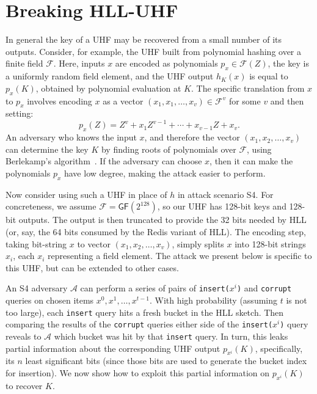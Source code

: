 \documentclass[sigconf, anonymous, dvipsnames]{acmart} %
\begin{document}
\section{Breaking HLL-UHF}\label{sec:UHF}

In general the key of a UHF may be recovered from a small number of its outputs. Consider, for example, the UHF built from polynomial hashing over a finite field $\mathcal{F}$. Here, inputs $x$ are encoded as polynomials $p_x \in \mathcal{F}(Z)$, the key is a uniformly random field element, and the UHF output $h_K(x)$  is equal to $p_x(K)$, obtained by polynomial evaluation at $K$. The specific translation from $x$ to $p_x$ involves encoding $x$ as a vector $(x_1,x_1,\ldots,x_v) \in \mathcal{F}^v$ for some $v$ and then setting:
\[
p_x(Z) = Z^v + x_1Z^{v-1} + \cdots + x_{v-1}Z + x_v.
\]
An adversary who knows the input $x$, and therefore the vector $(x_1,x_2,\ldots,x_v)$ can determine the key $K$ by finding roots of polynomials over $\mathcal{F}$, using Berlekamp's algorithm~\cite{Berlekamp}. If the adversary can choose $x$, then it can make the polynomials $p_x$ have low degree, making the attack easier to perform. 

Now consider using such a UHF in place of $h$ in attack scenario S4. For concreteness, we assume $\mathcal{F} = \textsf{GF}(2^{128})$, so our UHF has 128-bit keys and 128-bit outputs. The output is then truncated to provide the 32 bits needed by HLL (or, say, the 64 bits consumed by the Redis variant of HLL). The encoding step, taking bit-string $x$ to vector $(x_1,x_2,\ldots,x_v)$, simply splits $x$ into 128-bit strings $x_i$, each $x_i$ representing a field element. The attack we present below is specific to this UHF, but can be extended to other cases. 

An S4 adversary $\mathcal{A}$ can perform a series of pairs of \texttt{insert($x^i$)} and \texttt{corrupt} queries on chosen items $x^0, x^1, \ldots, x^{t-1}$. With high probability (assuming $t$ is not too large), each \texttt{insert} query hits a fresh bucket in the HLL sketch. Then comparing the results of the \texttt{corrupt} queries either side of the \texttt{insert($x^i$)} query reveals to $\mathcal{A}$ which bucket was hit by that  \texttt{insert} query. In turn, this leaks partial information about the corresponding UHF output $p_{x^i}(K)$, specifically, its $n$ least significant bits (since those bits are used to generate the bucket index for insertion). We now show how to exploit this partial information on $p_{x^i}(K)$ to recover $K$. 
\end{document}

